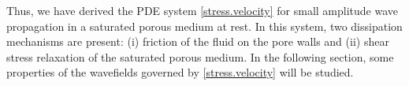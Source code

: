 \documentclass[3p,times,table]{article}
\begin{document}
Thus, we have derived the PDE system \eqref{stress.velocity} for small 
amplitude wave propagation in a saturated porous medium at rest. In this 
system, two dissipation mechanisms are present: (i) friction of the
fluid on the pore walls and (ii) shear stress relaxation of the 
saturated porous medium. In the following section, some properties of the 
wavefields governed by \eqref{stress.velocity} will be studied.

\end{document}
